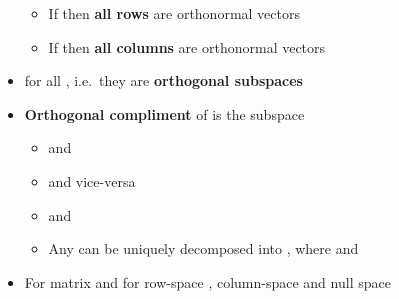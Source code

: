 \begin{itemize}
\begin{itemize}
                  \item
                        If  then \textbf{all  rows} are orthonormal
                        vectors
                  \item
                        If  then \textbf{all  columns} are orthonormal
                        vectors
            \end{itemize}
      \item
            for all , i.e.~they are
            \textbf{orthogonal subspaces}
      \item
            \textbf{Orthogonal compliment} of  is
            the subspace

            \begin{itemize}

                  \item
                         and
                  \item
                         and vice-versa
                  \item
                         and
                  \item
                        Any  can be uniquely decomposed
                        into , where
                         and
            \end{itemize}
      \item
            For matrix  and for row-space
            , column-space  and null
            space 


\end{itemize}
